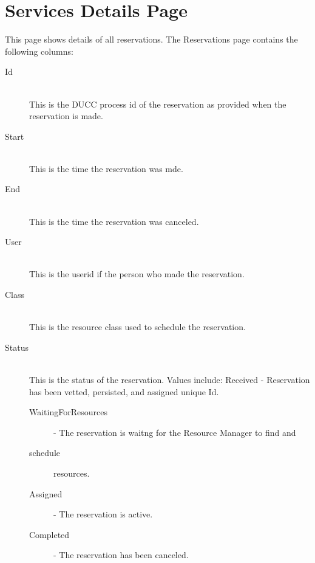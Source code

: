 
    \section{Services Details Page}

        This page shows details of all reservations. The Reservations page contains the following columns: 
        \begin{description}

            \item[Id] \hfill \\
              This is the DUCC process id of the reservation as provided when the reservation is
              made.

            \item[Start] \hfill \\
              This is the time the reservation was mde.
              
            \item[End] \hfill \\
              This is the time the reservation was canceled.
              
            \item[User] \hfill \\
              This is the userid if the person who made the reservation.
              
            \item[Class] \hfill \\
              This is the resource class used to schedule the reservation.
              
            \item[Status] \hfill \\
              This is the status of the reservation. Values include: Received - Reservation
              has been vetted, persisted, and assigned unique Id.
              \begin{description}
                  \item[WaitingForResources] - The reservation is waitng for the Resource Manager to find and 
                  \item[schedule] resources. 
                  \item[Assigned] - The reservation is active. 
                  \item[Completed] - The reservation has been canceled.                     
              \end{description}


\end{description}

